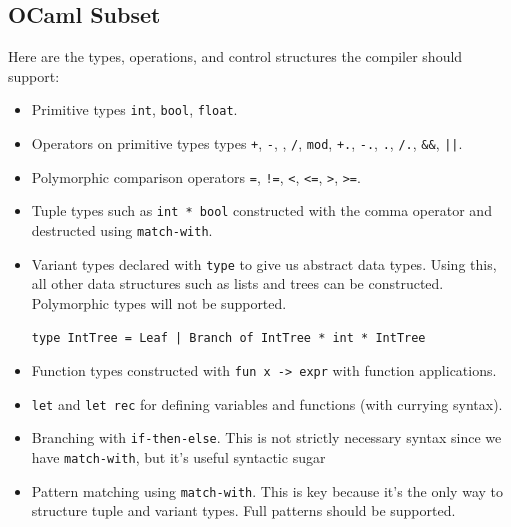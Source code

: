 \documentclass[12pt,a4paper,twoside,openright]{report}
\begin{document}
\subsection{OCaml Subset}
Here are the types, operations, and control structures the compiler should support:
\begin{itemize}
   \item
      Primitive types {\tt int}, {\tt bool}, {\tt float}.
   \item
      Operators on primitive types types {\tt +}, {\tt -}, {\tt *}, {\tt /}, {\tt mod}, {\tt +.}, {\tt -.}, {\tt *.}, {\tt /.}, {\tt \&\&}, {\tt ||}.
   \item
      Polymorphic comparison operators {\tt =}, {\tt !=}, {\tt <}, {\tt <=}, {\tt >}, {\tt >=}.
   \item
      Tuple types such as {\tt int * bool} constructed with the comma operator and destructed using {\tt match-with}.
   \item
      Variant types declared with {\tt type} to give us abstract data types. Using this, all other data structures such as lists and trees can be constructed. Polymorphic types will not be supported.
      \begin{verbatim}
type IntTree = Leaf | Branch of IntTree * int * IntTree \end{verbatim}
   \item
      Function types constructed with {\tt fun x -> expr} with function applications.
   \item
      {\tt let} and {\tt let rec} for defining variables and functions (with currying syntax).
   \item
      Branching with {\tt if-then-else}. This is not strictly necessary syntax since we have {\tt match-with}, but it's useful syntactic sugar
   \item
      Pattern matching using {\tt match-with}. This is key because it's the only way to structure tuple and variant types. Full patterns should be supported.

\end{itemize}
\end{document}

